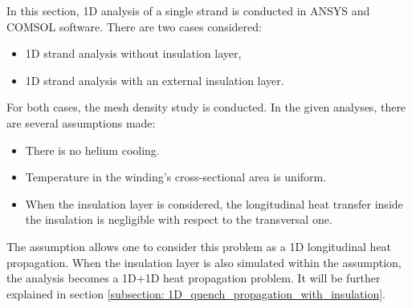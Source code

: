 
In this section, 1D analysis of a single strand is conducted in ANSYS and COMSOL software. There are two cases considered: 

\begin{itemize}
    \item 1D strand analysis without insulation layer,
    \item 1D strand analysis with an external insulation layer.
\end{itemize}

For both cases, the mesh density study is conducted. In the given analyses, there are several assumptions made: 

\begin{itemize}
    \item There is no helium cooling.
    \item Temperature in the winding's cross-sectional area is uniform.
    \item When the insulation layer is considered, the longitudinal heat transfer inside the insulation is negligible with respect to the transversal one.
\end{itemize}

The  assumption allows one to consider this problem as a 1D longitudinal heat propagation. When the insulation layer is also simulated within the  assumption, the analysis becomes a 1D+1D heat propagation problem. It will be further explained in section \ref{subsection: 1D_quench_propagation_with_insulation}.